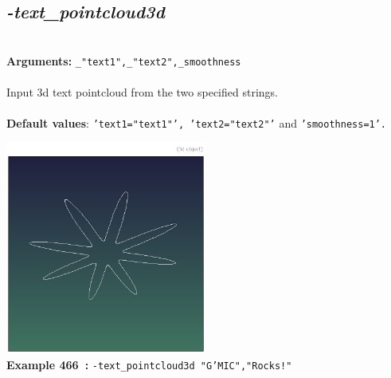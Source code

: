 \documentclass[a4paper,11pt,twoside]{book}
\begin{document}
\subsection{\emph{-text\_pointcloud3d} }\vspace*{-0.5em}
~\\\textbf{Arguments: } 
{\small \texttt{\_"text1",\_"text2",\_smoothness}}\\~\\
Input 3d text pointcloud from the two specified strings.
~\\~\\\textbf{Default values}: {\small \texttt{'text1="text1"', 'text2="text2"'} and \texttt{'smoothness=1'.}}
\begin{center}\includegraphics[keepaspectratio=true,height=7cm,width=\textwidth]{img/gmic_def466.jpg}\\
{\footnotesize \textbf{Example 466~:} \texttt{-text\_pointcloud3d "G'MIC","Rocks!"}}
\end{center}
\end{document}
